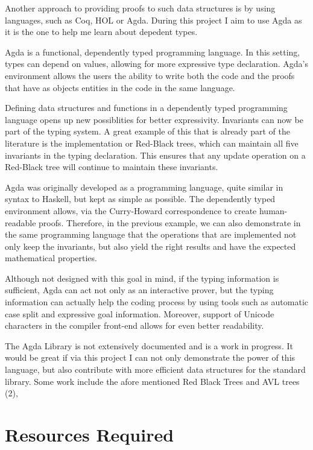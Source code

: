 \documentclass[12pt]{article}
\begin{document}
Another approach to providing proofs to such data structures is by using languages,
such as Coq, HOL or Agda. During this project I aim to use Agda as it is the one
to help me learn about depedent types.

Agda is a functional, dependently typed programming language. In this setting,
types can depend on values, allowing for more expressive type declaration.
Agda's environment allows the users the ability to write both the code and the
proofs that have as objects entities in the code in the same language.

Defining data structures and functions in a dependently typed programming language
opens up new possiblities for better expressivity. Invariants can now be part of
the typing system. A great example of this that is already part of the literature
is the implementation or Red-Black trees, which can maintain all five invariants
in the typing declaration. This ensures that any update operation on a Red-Black
tree will continue to maintain these invariants.

Agda was originally developed as a programming language, quite similar in syntax
to Haskell, but kept as simple as possible. The dependently typed environment
allows, via the Curry-Howard correspondence to create human-readable proofs.
Therefore, in the previous example, we can also demonstrate in the same programming
language that the operations that are implemented not only keep the invariants, but
also yield the right results and have the expected mathematical properties.

Although not designed with this goal in mind, if the typing information is
sufficient, Agda can act not only as an interactive prover, but the typing information
can actually help the coding process by using tools such as automatic case split and
expressive goal information.
Moreover, support of Unicode characters in the compiler front-end allows for
even better readability.

The Agda Library is not extensively documented and is a work in progress. It would
be great if via this project I can not only demonstrate the power of this language,
but also contribute with more efficient data structures for the standard library.
Some work include the afore mentioned Red Black Trees and AVL trees (2),


\section*{Resources Required}
\end{document}
